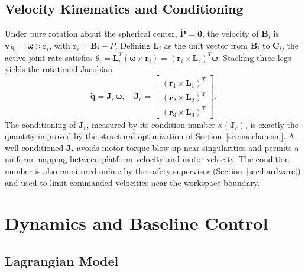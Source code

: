 \documentclass[conference]{IEEEtran}
\begin{document}
\subsection{Velocity Kinematics and Conditioning}

Under pure rotation about the spherical center, $\dot{\mathbf{P}}=\mathbf{0}$, the velocity of $\mathbf{B}_i$ is $\mathbf{v}_{B_i}=\boldsymbol{\omega}\times\mathbf{r}_i$, with $\mathbf{r}_i=\mathbf{B}_i-P$. Defining $\mathbf{L}_i$ as the unit vector from $\mathbf{B}_i$ to $\mathbf{C}_i$, the active-joint rate satisfies $\dot{\theta}_i=\mathbf{L}_i^{\!T}(\boldsymbol{\omega}\times\mathbf{r}_i)=(\mathbf{r}_i\times\mathbf{L}_i)^{\!T}\boldsymbol{\omega}$. Stacking three legs yields the rotational Jacobian
\begin{equation}
\dot{\boldsymbol{q}}=\mathbf{J}_r\,\boldsymbol{\omega},\quad
\mathbf{J}_r=\begin{bmatrix}(\mathbf{r}_1\times\mathbf{L}_1)^{\!T}\\(\mathbf{r}_2\times\mathbf{L}_2)^{\!T}\\(\mathbf{r}_3\times\mathbf{L}_3)^{\!T}\end{bmatrix}.
\label{eq:jacobian}
\end{equation}
The conditioning of $\mathbf{J}_r$, measured by its condition number $\kappa(\mathbf{J}_r)$, is exactly the quantity improved by the structural optimization of Section~\ref{sec:mechanism}. A well-conditioned $\mathbf{J}_r$ avoids motor-torque blow-up near singularities and permits a uniform mapping between platform velocity and motor velocity. The condition number is also monitored online by the safety supervisor (Section~\ref{sec:hardware}) and used to limit commanded velocities near the workspace boundary.

\section{Dynamics and Baseline Control}
\label{sec:dynamics}

\subsection{Lagrangian Model}
\end{document}
